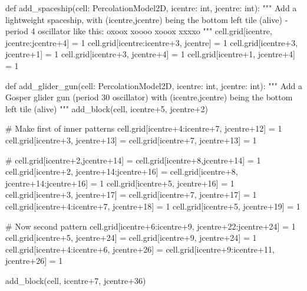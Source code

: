\documentclass[bibend=bibtex,lang=cn,11pt,a4paper]{elegantpaper}
\begin{document}
\begin{python}
def add_spaceship(cell: PercolationModel2D, icentre: int, jcentre: int):
    """
    Add a lightweight spaceship, with (icentre,jcentre) being the bottom left tile (alive) - period 4 oscillator
    like this:
        oxoox\n
        xoooo\n
        xooox\n
        xxxxo\n
    """
    cell.grid[icentre, jcentre:jcentre+4] = 1
    cell.grid[icentre:icentre+3, jcentre] = 1
    cell.grid[icentre+3, jcentre+1] = 1
    cell.grid[icentre+3, jcentre+4] = 1
    cell.grid[icentre+1, jcentre+4] = 1


def add_glider_gun(cell: PercolationModel2D, icentre: int, jcentre: int):
    """
    Add a Gosper glider gun (period 30 oscillator) with (icentre,jcentre) being the bottom left tile (alive)
    """
    add_block(cell, icentre+5, jcentre+2)

    # Make first of inner patterns
    cell.grid[icentre+4:icentre+7, jcentre+12] = 1
    cell.grid[icentre+3, jcentre+13] = cell.grid[icentre+7, jcentre+13] = 1

    # cell.grid[icentre+2,jcentre+14] = cell.grid[icentre+8,jcentre+14] = 1
    cell.grid[icentre+2, jcentre+14:jcentre+16] = cell.grid[icentre+8, jcentre+14:jcentre+16] = 1
    cell.grid[icentre+5, jcentre+16] = 1
    cell.grid[icentre+3, jcentre+17] = cell.grid[icentre+7, jcentre+17] = 1
    cell.grid[icentre+4:icentre+7, jcentre+18] = 1
    cell.grid[icentre+5, jcentre+19] = 1

    # Now second pattern
    cell.grid[icentre+6:icentre+9, jcentre+22:jcentre+24] = 1
    cell.grid[icentre+5, jcentre+24] = cell.grid[icentre+9, jcentre+24] = 1
    cell.grid[icentre+4:icentre+6, jcentre+26] = cell.grid[icentre+9:icentre+11, jcentre+26] = 1

    add_block(cell, icentre+7, jcentre+36)
\end{python}

\nocite{*}
\printbibliography[heading=bibintoc, title=\ebibname]

\appendix
\addappheadtotoc
\end{document}
